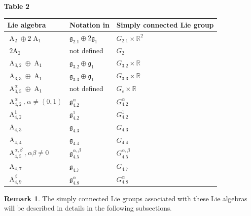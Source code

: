 \documentclass[12pt,a4paper,twoside]{article}
\theoremstyle{definition}
\newtheorem{remark}[theorem]{Remark}
\begin{document}
\begin{center}
	\newpage
	
\textbf{Table 2} \vspace{2mm}
	
\begin{tabular}{|p{3.5cm}|p{3.5cm}|p{3.5cm}|} \hline
Lie algebra  &  Notation in \cite{biggs2016classification} & Simply connected Lie group \\ \hline
$ \operatorname{A}_{2} \oplus 2\operatorname{A}_1 $ & $ \mathfrak{g}_{2.1} \oplus 2\mathfrak{g}_1 $ & $G_{2.1} \times \mathbb{R}^2$ \\ \hline
$ \operatorname{2A}_2 $ &  not defined & $G_2$ \\ \hline
$ \operatorname{A}_{3, 2} \oplus \operatorname{A}_1 $ & $ \mathfrak{g}_{3.2} \oplus \mathfrak{g}_1 $ & $G_{3.2} \times \mathbb{R}$ \\ \hline
$ \operatorname{A}_{3, 3} \oplus \operatorname{A}_1 $ & $ \mathfrak{g}_{3.3} \oplus \mathfrak{g}_1 $ & $G_{3.3} \times \mathbb{R}$ \\ \hline
$\operatorname{A}_{3, 5}^{\alpha} \oplus \operatorname{A}_1$  & not defined & $G_{c} \times \mathbb{R}$ \\ \hline
$ \operatorname{A}_{4, 2}^{\alpha}, \alpha \neq (0, 1)$ & $ \mathfrak{g}_{4.2}^{\alpha}$ & $G_{4.2}^{\alpha}$ \\ \hline
$ \operatorname{A}_{4, 2}^{1}$ & $ \mathfrak{g}_{4.2}^{1}$ & $G_{4.2}^{1}$ \\ \hline
$ \operatorname{A}_{4, 3} $ & $ \mathfrak{g}_{4.3} $ & $G_{4.3}$ \\ \hline
$ \operatorname{A}_{4, 4} $ & $ \mathfrak{g}_{4.4} $ &  $G_{4.4}$ \\ \hline
$ \operatorname{A}_{4, 5}^{\alpha, \beta}, \alpha\beta \neq 0$ & $ \mathfrak{g}_{4.5}^{\alpha, \beta}$ & $G_{4.5}^{\alpha, \beta}$  \\ \hline	
$ \operatorname{A}_{4, 7} $ & $ \mathfrak{g}_{4.7} $ & $G_{4.7}$  \\ \hline
$ \operatorname{A}_{4, 9}^{\beta} $ & $ \mathfrak{g}_{4.8}^{\alpha} $ & $G_{4.8}^{\alpha} $ \\ \hline
\end{tabular}
\end{center}
\begin{remark}
The simply connected Lie groups associated with these Lie algebras will be described in details in the following subsections.
\end{remark}
\end{document}
